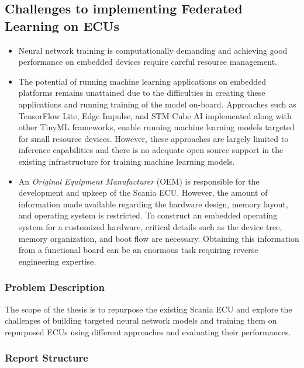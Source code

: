 \subsection*{Challenges to implementing Federated Learning on ECUs}

\begin{itemize}
	\item Neural network training is computationally demanding and achieving good performance on embedded devices require careful resource management.
	\item The potential of running machine learning applications on embedded platforms remains unattained due to the difficulties in creating these applications and running training of the model on-board. Approaches such as TensorFlow Lite, Edge Impulse, and STM Cube AI implemented along with other TinyML frameworks, enable running machine learning models targeted for small resource devices. However, these approaches are largely limited to inference capabilities and there is no adequate open source support in the existing infrastructure for training machine learning models.
	\item An \textit{Original Equipment Manufacturer} (OEM) is responsible for the development and upkeep of the Scania ECU. However, the amount of information made available regarding the hardware design, memory layout, and operating system is restricted. To construct an embedded operating system for a customized hardware, critical details such as the device tree, memory organization, and boot flow are necessary. Obtaining this information from a functional board can be an enormous task requiring reverse engineering expertise.
\end{itemize}

\subsubsection{Problem Description}


The scope of the thesis is to repurpose the existing Scania ECU and explore the challenges of building targeted neural network models and training them on repurposed ECUs using different approaches and evaluating their performances.

\subsubsection{Report Structure}

